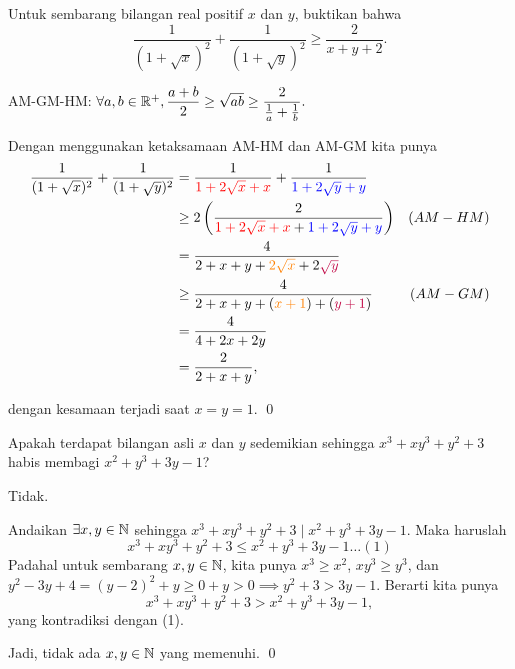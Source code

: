 \documentclass[11pt]{scrartcl}
\begin{document}
	\begin{soaljawab}
	Untuk sembarang bilangan real positif $x$ dan $y$, buktikan bahwa $$\dfrac{1}{(1+\sqrt{x})^2}+\dfrac{1}{(1+\sqrt{y})^2} \ge \dfrac{2}{x+y+2}.$$
	\begin{solusi}
	
	\begin{lemmarev}
	AM-GM-HM: $\forall a,b \in \mathbb R^+, \dfrac{a+b}{2} \ge \sqrt{ab} \ge \dfrac{2}{\frac{1}{a}+\frac{1}{b}}.$
	\end{lemmarev}
	
	Dengan menggunakan ketaksamaan AM-HM dan AM-GM kita punya
	\begin{align*}
		\dfrac{1}{(1+\sqrt{x})^2}+\dfrac{1}{(1+\sqrt{y})^2} 
		&= \dfrac{1}{\color{red}1+2\sqrt{x}+x}+\dfrac{1}{\color{blue}1+2\sqrt{y}+y}  \\
		&\ge 2\left(\dfrac{2}{{\color{red}1+2\sqrt{x}+x}+{\color{blue}1+2\sqrt{y}+y}}\right) & (AM-HM)\\
		&= \dfrac{4}{2+x+y+{\color{orange}2\sqrt{x}}+{2\color{purple}\sqrt{y}}}\\
		&\ge \dfrac{4}{2+x+y+({\color{orange}x+1})+({\color{purple}y+1})}  & (AM-GM)\\
		&= \dfrac{4}{4+2x+2y}\\
		&= \dfrac{2}{2+x+y},
	\end{align*}
	
	dengan kesamaan terjadi saat $x=y=1$. \qed
	\end{solusi}
	
	\end{soaljawab}
	
	\begin{soaljawab} Apakah terdapat bilangan asli $x$ dan $y$ sedemikian sehingga $x^3+xy^3+y^2+3$ habis membagi $x^2+y^3+3y-1$?
	\begin{jawaban}
	Tidak.
	\end{jawaban}
	\begin{solusi}
	Andaikan $\exists x,y \in \mathbb N$ sehingga $x^3+xy^3+y^2+3 \mid x^2+y^3+3y-1$. Maka haruslah 
	 $$x^3+xy^3+y^2+3 \le x^2+y^3+3y-1 \dots (1)$$
	Padahal untuk sembarang $x,y \in \mathbb N$, kita punya $x^3 \ge x^2$,   $xy^3 \ge y^3$, dan\\ $y^2-3y+4 = (y-2)^2+y \ge 0 + y > 0 \implies y^2+3 > 3y -1$. Berarti kita punya $$x^3+xy^3+y^2+3 > x^2+y^3+3y-1,$$ yang kontradiksi dengan (1).
	
	Jadi, tidak ada $x,y \in \mathbb N$ yang memenuhi. \qed
	\end{solusi}
	\end{soaljawab}
	
\end{document}
